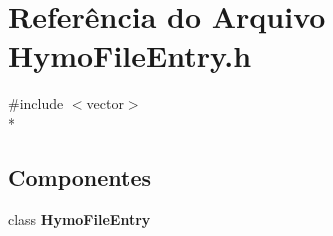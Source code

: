 \section{Referência do Arquivo Hymo\+File\+Entry.\+h}
\label{_hymo_file_entry_8h}
{\ttfamily \#include $<$vector$>$}\\*
\subsection*{Componentes}
\begin{DoxyCompactItemize}
\item 
class {\bf Hymo\+File\+Entry}
\end{DoxyCompactItemize}
